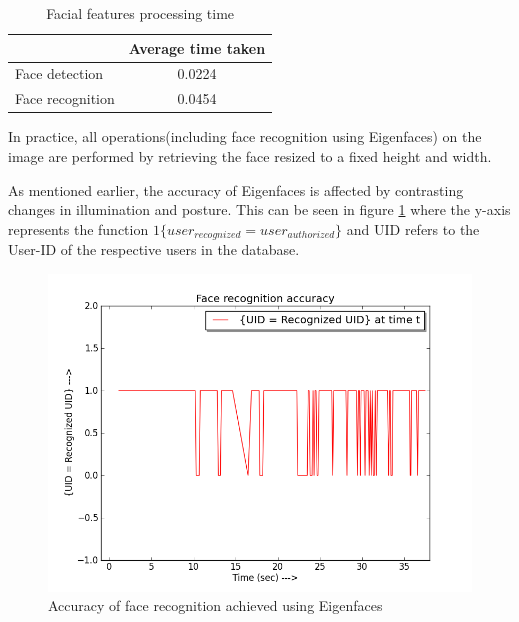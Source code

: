 \documentclass[12pt]{report}			%
\begin{document}
\begin{table}[htp]
	\centering
	\caption{Facial features processing time}
	\begin{tabular}{||l|c||} \hline \hline
			    &  Average time taken \\ \hline
	Face detection      &  0.0224             \\ \hline
	Face recognition    &  0.0454             \\ \hline \hline
	\end{tabular}
	\label{tab:fdr}
\end{table}
In practice, all operations(including face recognition using Eigenfaces) on the image are performed by retrieving the face resized to a fixed height and width.

As mentioned earlier, the accuracy of Eigenfaces is affected by contrasting changes in illumination and posture.
This can be seen in figure \ref{fig:fracc} where the y-axis represents the function $1\{user_{recognized}=user_{authorized}\}$ and UID refers to the User-ID of the respective users in the database.
\begin{figure}[h!]
	\centering
	\includegraphics[scale=0.40]{img/face_rec_accuracy.png}
	\caption{Accuracy of face recognition achieved using Eigenfaces}
	\label{fig:fracc}
\end{figure}
\end{document}
